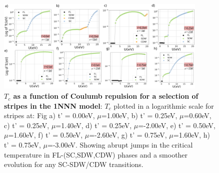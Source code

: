 \documentclass[12pt]{article}
\begin{document}
\begin{figure}[htbp]  %
    \centering
    \includegraphics[width=0.90\textwidth]{1NNNstripes.png}  %
    \caption{\textbf{$T_c$ as a function of Coulumb repulsion for a selection of stripes in the 1NNN model}: $T_c$ plotted in
    a logarithmic scale for stripes at:  Fig a) t' = 0.00eV, $\mu$=1.00eV, b) t' = 0.25eV, $\mu$=0.60eV, c) t' = 0.25eV, $\mu$=1.40eV,
    d) t' = 0.25eV, $\mu$=-2.00eV,
    e) t' = 0.50eV, $\mu$=1.60eV,
    f) t' = 0.50eV, $\mu$=-2.60eV,
    g) t' = 0.75eV, $\mu$=1.60eV, 
    h) t' = 0.75eV, $\mu$=-3.00eV.
    Showing abrupt jumps in the critical temperature in FL-(SC,SDW,CDW) phases and a smoother
    evolution for any SC-SDW/CDW transitions.  }
    \label{fig:1NNNStripes}
\end{figure}
\end{document}
